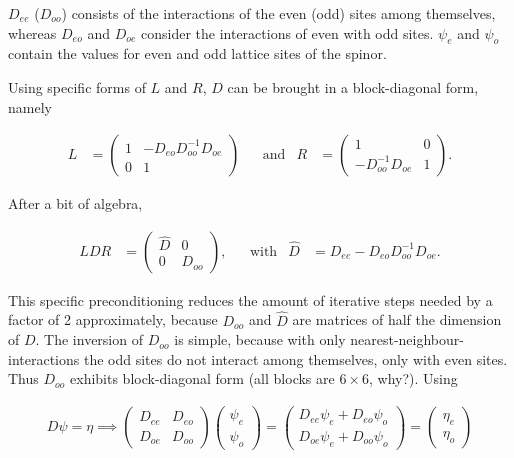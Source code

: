 \documentclass{article}
\theoremstyle{plain} %
\theoremstyle{convention} %
\theoremstyle{remark} %
\numberwithin{equation}{section}
\begin{document}
$D_{ee}$ ($D_{oo}$) consists of the interactions of the even (odd) sites among themselves, whereas $D_{eo}$ and $D_{oe}$ consider the interactions of even with odd sites. $\psi_e$ and $\psi_o$ contain the values for even and odd lattice sites of the spinor.

Using specific forms of $L$ and $R$, $D$ can be brought in a block-diagonal form, namely

\begin{align*}
    L &= 
        \begin{pmatrix}
        1 & -D_{eo} D_{oo}^{-1} D_{oe} \\
        0 & 1
        \end{pmatrix}
    & &\text{and} &
    R &= 
        \begin{pmatrix}
        1 & 0 \\
        -D_{oo}^{-1} D_{oe} & 1
        \end{pmatrix}.
\end{align*}

After a bit of algebra,

\begin{align*}
    L D R &= 
        \begin{pmatrix}
        \hat{D} & 0 \\
        0 & D_{oo}
        \end{pmatrix},
    & &\text{with} &
    \hat{D} &= D_{ee} - D_{eo} D_{oo}^{-1} D_{oe}.
\end{align*}

This specific preconditioning reduces the amount of iterative steps needed by a factor of \num{2} approximately, because $D_{oo}$ and $\hat{D}$ are matrices of half the dimension of $D$. The inversion of $D_{oo}$ is simple, because with only nearest-neighbour-interactions the odd sites do not interact among themselves, only with even sites. Thus $D_{oo}$ exhibits block-diagonal form (all blocks are $6 \times 6$, why?). Using

\begin{align*}
    D \psi = \eta \implies \begin{pmatrix}
    D_{ee} & D_{eo} \\
    D_{oe} & D_{oo}
    \end{pmatrix} \begin{pmatrix} \psi_e \\ \psi_o \end{pmatrix} = \begin{pmatrix} D_{ee} \psi_e + D_{eo} \psi_o \\ D_{oe}\psi_e + D_{oo} \psi_o \end{pmatrix} = \begin{pmatrix} \eta_e \\ \eta_o \end{pmatrix}
\end{align*}
\end{document}
